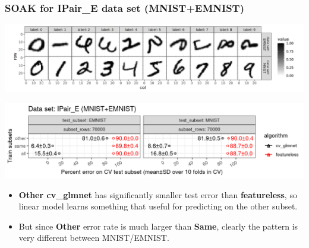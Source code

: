 \documentclass[t]{beamer}
\begin{document}
\begin{frame}
  \frametitle{SOAK for IPair\_E data set (MNIST+EMNIST)}

  \includegraphics[width=\textwidth]{data_Classif_MNIST_other_EMNIST.png}
  
  \includegraphics[width=\textwidth]{MNIST_EMNIST_error_glmnet_featureless_mean_SD_zoom.png}
  \begin{itemize}
  \item \textbf{Other cv\_glmnet} has significantly smaller test error
    than \textbf{featureless}, so linear model learns something that useful for predicting on the other subset.
  \item But since \textbf{Other} error rate is much larger than
    \textbf{Same}, clearly the pattern is very different between
    MNIST/EMNIST.
  \end{itemize}
\end{frame}
\end{document}
